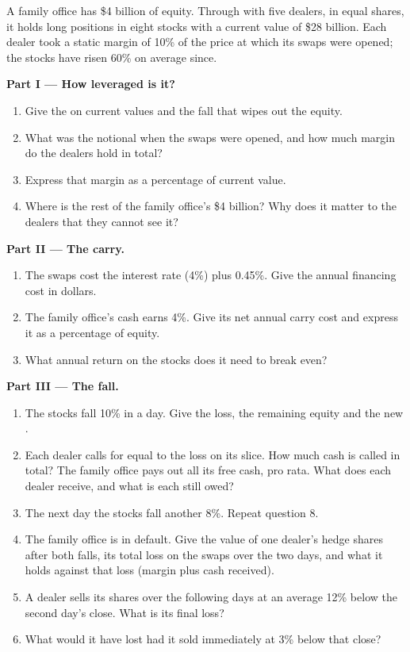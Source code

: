 \begin{problem}\label{pb:m1:financing:1}
A family office has \$4 billion of equity. Through  with
five dealers, in equal shares, it holds long positions in eight stocks with
a current value of \$28 billion. Each dealer took a static margin of 10\% of
the price at which its swaps were opened; the stocks have risen 60\% on
average since.

\medskip\noindent\textbf{Part I --- How leveraged is it?}
\begin{enumerate}
\item Give the  on current values and the fall that wipes out the
equity.
\item What was the notional when the swaps were opened, and how much margin
do the dealers hold in total?
\item Express that margin as a percentage of current value.
\item Where is the rest of the family office's \$4 billion? Why does it
matter to the dealers that they cannot see it?
\end{enumerate}

\medskip\noindent\textbf{Part II --- The carry.}
\begin{enumerate}[resume]
\item The swaps cost the interest rate (4\%) plus 0.45\%. Give the annual
financing cost in dollars.
\item The family office's cash earns 4\%. Give its net annual carry cost and
express it as a percentage of equity.
\item What annual return on the stocks does it need to break even?
\end{enumerate}

\medskip\noindent\textbf{Part III --- The fall.}
\begin{enumerate}[resume]
\item The stocks fall 10\% in a day. Give the loss, the remaining equity and
the new .
\item Each dealer calls for  equal to the loss on its slice.
How much cash is called in total? The family office pays out all its free
cash, pro rata. What does each dealer receive, and what is each still owed?
\item The next day the stocks fall another 8\%. Repeat question 8.
\item The family office is in default. Give the value of one dealer's hedge
shares after both falls, its total loss on the swaps over the two days, and
what it holds against that loss (margin plus cash received).
\item A dealer sells its shares over the following days at an average 12\%
below the second day's close. What is its final loss?
\item What would it have lost had it sold immediately at 3\% below that
close?
\end{enumerate}


\end{problem}

